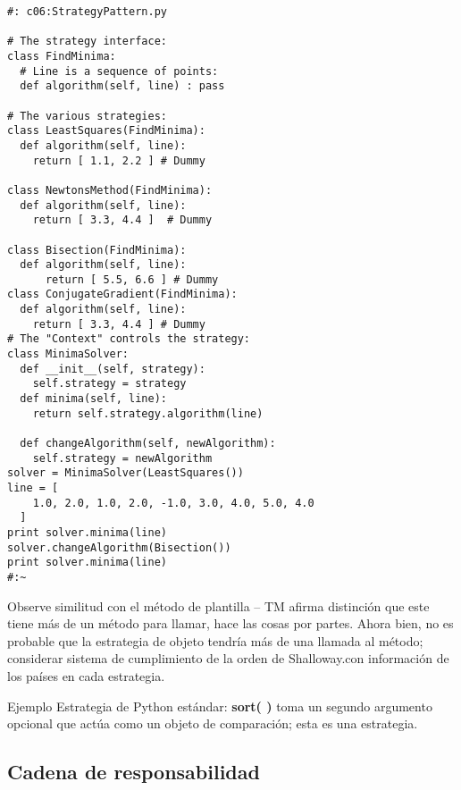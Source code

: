 \begin{lstlisting} 
#: c06:StrategyPattern.py 

# The strategy interface: 
class FindMinima: 
  # Line is a sequence of points: 
  def algorithm(self, line) : pass 
  
# The various strategies: 
class LeastSquares(FindMinima): 
  def algorithm(self, line): 
    return [ 1.1, 2.2 ] # Dummy 
    
class NewtonsMethod(FindMinima): 
  def algorithm(self, line): 
    return [ 3.3, 4.4 ]  # Dummy 
    
class Bisection(FindMinima): 
  def algorithm(self, line): 
      return [ 5.5, 6.6 ] # Dummy 
class ConjugateGradient(FindMinima): 
  def algorithm(self, line): 
    return [ 3.3, 4.4 ] # Dummy 
# The "Context" controls the strategy: 
class MinimaSolver: 
  def __init__(self, strategy): 
    self.strategy = strategy 
  def minima(self, line): 
    return self.strategy.algorithm(line) 
    
  def changeAlgorithm(self, newAlgorithm): 
    self.strategy = newAlgorithm 
solver = MinimaSolver(LeastSquares()) 
line = [ 
    1.0, 2.0, 1.0, 2.0, -1.0, 3.0, 4.0, 5.0, 4.0  
  ] 
print solver.minima(line) 
solver.changeAlgorithm(Bisection()) 
print solver.minima(line) 
#:~ 
\end{lstlisting}

Observe similitud con el método de plantilla  – TM afirma distinción que este tiene más de un método para llamar, hace las cosas por partes. Ahora bien, no es probable que la estrategia de objeto tendría más de una llamada al método; considerar sistema de cumplimiento de la orden de Shalloway.con información de los países en cada estrategia.  \newline

Ejemplo Estrategia de Python estándar: \textbf{sort( )} toma un segundo argumento opcional que actúa como un objeto de comparación; esta es una estrategia.    \newpage

\subsection*{Cadena de responsabilidad}
\label{subsec:cdr}

